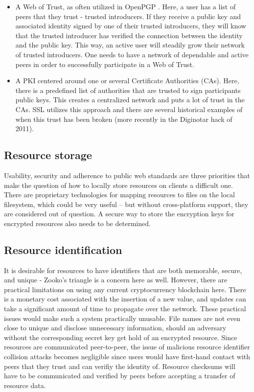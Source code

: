 \begin{itemize}
  \item A Web of Trust, as often utilized in OpenPGP \cite{Maurer:1996}. Here, a user has a list of peers that they trust - trusted introducers. If they receive a public key and associated identity signed by one of their trusted introducers, they will know that the trusted introducer has verified the connection between the identity and the public key. This way, an active user will steadily grow their network of trusted introducers. One needs to have a network of dependable and active peers in order to successfully participate in a Web of Trust.
\item A PKI centered around one or several Certificate Authorities (CAs). Here, there is a predefined list of authorities that are trusted to sign participants public keys. This creates a centralized network and puts a lot of trust in the CAs. SSL utilizes this approach and there are several historical examples of when this trust has been broken (more recently in the Diginotar hack of 2011).
\end{itemize}

\subsection{Resource storage}
Usability, security and adherence to public web standards are three priorities that make the question of how to locally store resources on clients a difficult one. There are proprietary technologies for mapping resources to files on the local filesystem, which could be very useful – but without cross-platform support, they are considered out of question. A secure way to store the encryption keys for encrypted resources also needs to be determined.

\subsection{Resource identification}
It is desirable for resources to have identifiers that are both memorable, secure, and unique - Zooko’s triangle is a concern here as well. However, there are practical limitations on using any current cryptocurrency blockchain here. There is a monetary cost associated with the insertion of a new value, and updates can take a significant amount of time to propagate over the network. These practical issues would make such a system practically unusable. File names are not even close to unique and disclose unnecessary information, should an adversary without the corresponding secret key get hold of an encrypted resource. Since resources are communicated peer-to-peer, the issue of malicious resource identifier collision attacks becomes negligible since users would have first-hand contact with peers that they trust and can verifiy the identity of. Resource checksums will have to be communicated and verified by peers before accepting a transfer of resource data.

